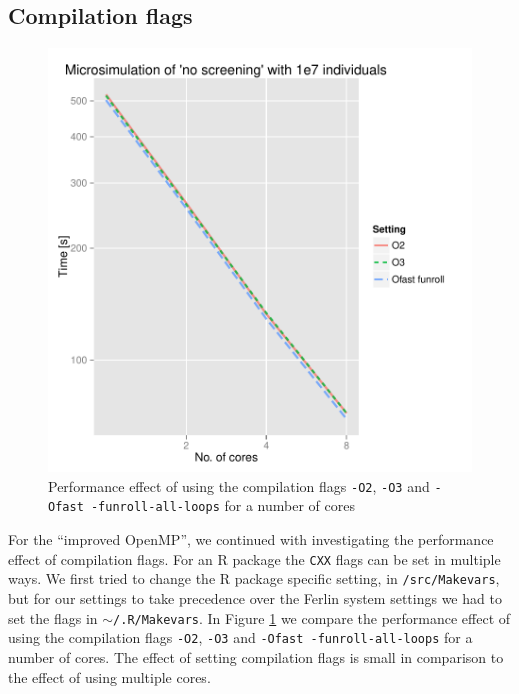 

\subsection{Compilation flags}

\begin{figure}[!htbp] \centering
  \includegraphics[height=0.5\textheight]{images/flagsProfiling.pdf}
  \caption{Performance effect of using the compilation flags \texttt{-O2}, \texttt{-O3} and \texttt{-Ofast -funroll-all-loops} for a number of cores}
  \label{fig:flagScaling}
\end{figure}

For the ``improved OpenMP'', we continued with investigating the
performance effect of compilation flags. For an R package the
\texttt{CXX} flags can be set in multiple ways. We first tried to change the R package
specific setting, in \texttt{/src/Makevars}, but for our settings to
take precedence over the Ferlin system settings we had to set the
flags in \texttt{$\sim$/.R/Makevars}. In Figure \ref{fig:flagScaling} we
compare the performance effect of using the compilation flags
\texttt{-O2}, \texttt{-O3} and \texttt{-Ofast -funroll-all-loops} for
a number of cores. The effect of setting compilation flags is small in
comparison to the effect of using multiple cores.

